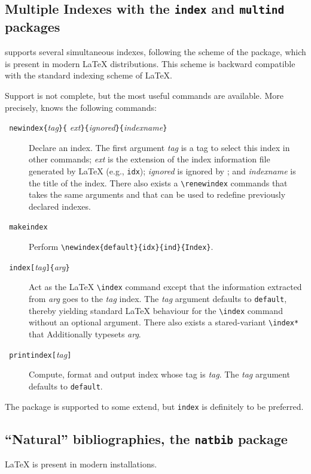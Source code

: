 \subsection{Multiple Indexes with the \texttt{index} and
\texttt{multind}\label{multind} packages}
%
\hevea{} supports several simultaneous indexes, following the scheme
of the
 package,
which is present in modern \LaTeX{} distributions.
This scheme is backward compatible with the standard indexing scheme
of \LaTeX.

Support is not complete, but the most useful commands are available.
More precisely, \hevea{} knows the following commands:
\begin{description}
\item[{\tt{} newindex\{}{\it tag}{\tt \}\{}{\it
ext}{\tt\}\{}{\it ignored}{\tt\}\{}{\it indexname}{\tt\}}]
Declare an index.
The first argument {\it tag} is a tag to select this index in other
commands; {\it ext} is the extension of the index information file
generated by \LaTeX{} (e.g., \texttt{idx}); {\it ignored} is ignored by
\hevea{}; and {\it indexname} is the title of the index.
There also exists a
\verb+\renewindex+ commands that takes the same arguments and that can be
used to redefine previously declared indexes.
\item[{\tt{} makeindex}] Perform
\verb+\newindex{default}{idx}{ind}{Index}+.
\item[{\tt{} index[}{\it tag}{\tt]\{}{\it arg}{\tt\}}]
Act as the \LaTeX{} \verb+\index+ command except that the information
extracted from {\it arg} goes to the {\it tag} index.
The {\it tag} argument defaults to \verb+default+, thereby yielding
standard \LaTeX{} behaviour for the \verb+\index+ command without an
optional argument.
There also exists a stared-variant \verb+\index*+ that Additionally
typesets {\it arg}.
\item[{\tt{} printindex[}{\it tag}{\tt]}] Compute, format and
output index whose tag is \textit{tag}. The {\it tag} argument
defaults to \verb+default+.
\end{description}

The  package is
supported to some extend, but \texttt{index} is definitely to be
preferred.

\subsection{``Natural'' bibliographies, the \texttt{natbib} package }
\LaTeX{} 
is present in modern installations.

